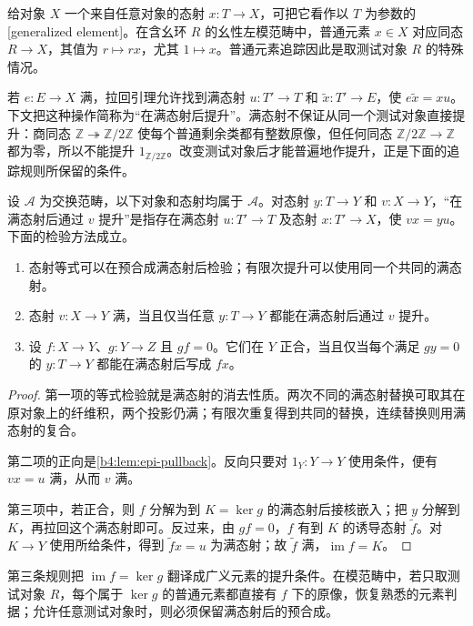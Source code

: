 给对象 \(X\) 一个来自任意对象的态射 \(x:T\to X\)，可把它看作以 \(T\) 为参数的[generalized element]。在含幺环 \(R\) 的幺性左模范畴中，普通元素 \(x\in X\) 对应同态 \(R\to X\)，其值为 \(r\mapsto rx\)，尤其 \(1\mapsto x\)。普通元素追踪因此是取测试对象 \(R\) 的特殊情况。

\ProseParagraphBreak
若 \(e:E\to X\) 满，拉回引理允许找到满态射 \(u:T'\to T\) 和 \(\tilde x:T'\to E\)，使 \(e\tilde x=xu\)。下文把这种操作简称为“在满态射后提升”。满态射不保证从同一个测试对象直接提升：商同态 \(\mathbb Z\twoheadrightarrow\mathbb Z/2\mathbb Z\) 使每个普通剩余类都有整数原像，但任何同态 \(\mathbb Z/2\mathbb Z\to\mathbb Z\) 都为零，所以不能提升 \(1_{\mathbb Z/2\mathbb Z}\)。改变测试对象后才能普遍地作提升，正是下面的追踪规则所保留的条件。

\begin{lemma}\label{b4:lem:generalized-element-calculus}
	设 \(\mathcal A\) 为交换范畴，以下对象和态射均属于 \(\mathcal A\)。对态射 \(y:T\to Y\) 和 \(v:X\to Y\)，“在满态射后通过 \(v\) 提升”是指存在满态射 \(u:T'\to T\) 及态射 \(x:T'\to X\)，使 \(vx=yu\)。下面的检验方法成立。
	\begin{enumerate}
		\item 态射等式可以在预合成满态射后检验；有限次提升可以使用同一个共同的满态射。
		\item 态射 \(v:X\to Y\) 满，当且仅当任意 \(y:T\to Y\) 都能在满态射后通过 \(v\) 提升。
		\item 设 \(f:X\to Y\)、\(g:Y\to Z\) 且 \(gf=0\)。它们在 \(Y\) 正合，当且仅当每个满足 \(gy=0\) 的 \(y:T\to Y\) 都能在满态射后写成 \(f x\)。
	\end{enumerate}
\end{lemma}
\begin{proof}
	第一项的等式检验就是满态射的消去性质。两次不同的满态射替换可取其在原对象上的纤维积，两个投影仍满；有限次重复得到共同的替换，连续替换则用满态射的复合。

	第二项的正向是\cref{b4:lem:epi-pullback}。反向只要对 \(1_Y:Y\to Y\) 使用条件，便有 \(v x=u\) 满，从而 \(v\) 满。

	第三项中，若正合，则 \(f\) 分解为到 \(K=\ker g\) 的满态射后接核嵌入；把 \(y\) 分解到 \(K\)，再拉回这个满态射即可。反过来，由 \(gf=0\)，\(f\) 有到 \(K\) 的诱导态射 \(\tilde f\)。对 \(K\to Y\) 使用所给条件，得到 \(\tilde f x=u\) 为满态射；故 \(\tilde f\) 满，\(\operatorname{im}f=K\)。
\end{proof}

第三条规则把 \(\operatorname{im}f=\ker g\) 翻译成广义元素的提升条件。在模范畴中，若只取测试对象 \(R\)，每个属于 \(\ker g\) 的普通元素都直接有 \(f\) 下的原像，恢复熟悉的元素判据；允许任意测试对象时，则必须保留满态射后的预合成。

